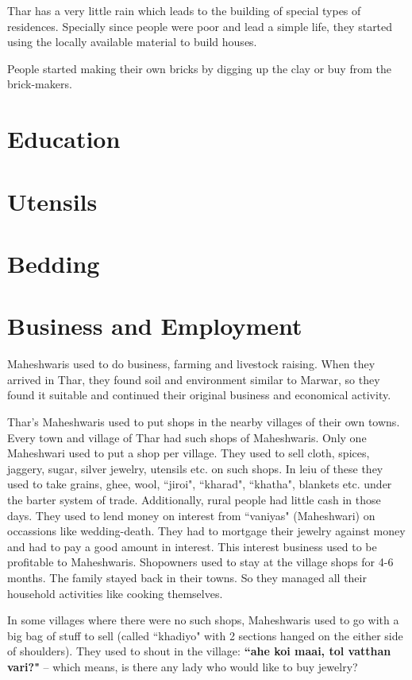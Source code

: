 Thar has a very little rain which leads to the building of special types of residences. Specially since people were poor and lead a simple life, they started using the locally available material to build houses.

People started making their own bricks by digging up the clay or buy from the brick-makers.
\section{Education}
\section{Utensils}
\section{Bedding}
\section{Business and Employment}
Maheshwaris used to do business, farming and livestock raising. When they arrived in Thar, they found soil and environment similar to Marwar, so they found it suitable and continued their original business and economical activity.

Thar's Maheshwaris used to put shops in the nearby villages of their own towns. Every town and village of Thar had such shops of Maheshwaris. Only one Maheshwari used to put a shop per village. They used to sell cloth, spices, jaggery, sugar, silver jewelry, utensils etc. on such shops. In leiu of these they used to take grains, ghee, wool, ``jiroi", ``kharad", ``khatha", blankets etc. under the barter system of trade. Additionally, rural people had little cash in those days. They used to lend money on interest from ``vaniyas" (Maheshwari) on occassions like wedding-death. They had to mortgage their jewelry against money and had to pay a good amount in interest. This interest business used to be profitable to Maheshwaris. Shopowners used to stay at the village shops for 4-6 months. The family stayed back in their towns. So they managed all their household activities like cooking themselves.

In some villages where there were no such shops, Maheshwaris used to go with a big bag of stuff to sell (called ``khadiyo" with 2 sections hanged on the either side of shoulders). They used to shout in the village: \textbf{``ahe koi maai, tol vatthan vari?"} -- which means, is there any lady who would like to buy jewelry?

